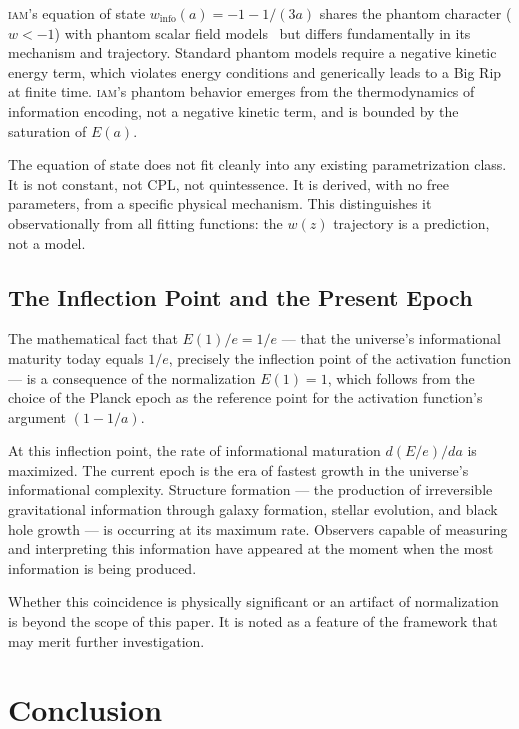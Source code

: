 \documentclass[12pt,letterpaper]{article}
\newcommand{\IAM}{\textsc{iam}}
\newcommand{\Ea}{E(a)}
\newcommand{\winfo}{w_{\mathrm{info}}(a)}
\begin{document}
\IAM's equation of state $\winfo = -1 - 1/(3a)$ shares the phantom character ($w < -1$) with phantom scalar field models~\citep{Caldwell2002} but differs fundamentally in its mechanism and trajectory. Standard phantom models require a negative kinetic energy term, which violates energy conditions and generically leads to a Big Rip at finite time. \IAM's phantom behavior emerges from the thermodynamics of information encoding, not a negative kinetic term, and is bounded by the saturation of $\Ea$.

The equation of state does not fit cleanly into any existing parametrization class. It is not constant, not CPL, not quintessence. It is derived, with no free parameters, from a specific physical mechanism. This distinguishes it observationally from all fitting functions: the $w(z)$ trajectory is a prediction, not a model.

\subsection{The Inflection Point and the Present Epoch}

The mathematical fact that $E(1)/e = 1/e$ --- that the universe's informational maturity today equals $1/e$, precisely the inflection point of the activation function --- is a consequence of the normalization $E(1) = 1$, which follows from the choice of the Planck epoch as the reference point for the activation function's argument $(1 - 1/a)$.

At this inflection point, the rate of informational maturation $d(E/e)/da$ is maximized. The current epoch is the era of fastest growth in the universe's informational complexity. Structure formation --- the production of irreversible gravitational information through galaxy formation, stellar evolution, and black hole growth --- is occurring at its maximum rate. Observers capable of measuring and interpreting this information have appeared at the moment when the most information is being produced.

Whether this coincidence is physically significant or an artifact of normalization is beyond the scope of this paper. It is noted as a feature of the framework that may merit further investigation.

\section{Conclusion}
\label{sec:conclusion}
\end{document}
